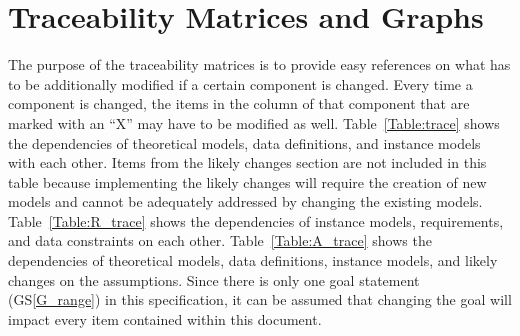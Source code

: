 \documentclass[12pt]{article}
\newcommand{\gsref}[1]{GS\ref{#1}}
\begin{document}
\section{Traceability Matrices and Graphs}
\label{trace}

The purpose of the traceability matrices is to provide easy references on what
has to be additionally modified if a certain component is changed.  Every time a
component is changed, the items in the column of that component that are marked
with an ``X'' may have to be modified as well.  Table~\ref{Table:trace} shows 
the dependencies of theoretical models, data definitions, and instance models 
with each other. Items from the likely changes section are not included in this 
table because implementing the likely changes will require the creation of new 
models and cannot be adequately addressed by changing the existing models. 
Table~\ref{Table:R_trace} shows the dependencies of instance models, 
requirements, and data constraints on each other. Table~\ref{Table:A_trace} 
shows the dependencies of theoretical models, data definitions, instance 
models, and likely changes on the assumptions. Since there is only one goal 
statement (\gsref{G_range}) in this specification, it can be assumed that 
changing the goal will impact every item contained within this document.
\end{document}
